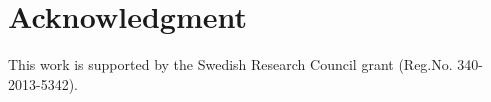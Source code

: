 \documentclass[journal,onecolumn]{IEEEtran}
\begin{document}
\section*{Acknowledgment}

This work is supported by the Swedish Research Council grant (Reg.No. 340-2013-5342).


\ifCLASSOPTIONcaptionsoff
  \newpage
\fi





%
%
%


%


\end{document}
